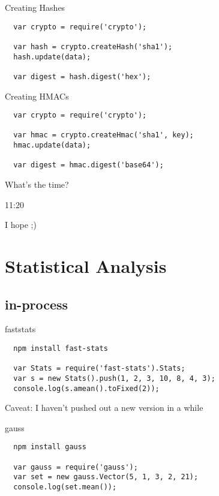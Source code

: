 \documentclass{beamer}
\begin{document}
\begin{frame}[fragile]{Creating Hashes}
\begin{verbatim}
  var crypto = require('crypto');

  var hash = crypto.createHash('sha1');
  hash.update(data);

  var digest = hash.digest('hex');
\end{verbatim}
\end{frame}

\begin{frame}[fragile]{Creating HMACs}
\begin{verbatim}
  var crypto = require('crypto');

  var hmac = crypto.createHmac('sha1', key);
  hmac.update(data);

  var digest = hmac.digest('base64');
\end{verbatim}
\end{frame}

\begin{frame}{What's the time?}
\begin{center}
\LARGE 11:20

\tiny I hope ;)
\end{center}
\end{frame}

\section{Statistical Analysis}
\subsection{in-process}

\begin{frame}[fragile]{faststats}
\begin{verbatim}
  npm install fast-stats

  var Stats = require('fast-stats').Stats;
  var s = new Stats().push(1, 2, 3, 10, 8, 4, 3);
  console.log(s.amean().toFixed(2));
\end{verbatim}
Caveat: I haven't pushed out a new version in a while
\end{frame}

\begin{frame}[fragile]{gauss}
\begin{verbatim}
  npm install gauss

  var gauss = require('gauss');
  var set = new gauss.Vector(5, 1, 3, 2, 21);
  console.log(set.mean());
\end{verbatim}
\end{frame}
\end{document}
